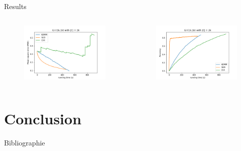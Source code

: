 \documentclass{beamer}
\begin{document}
\begin{frame}{Results}
\begin{columns}
\begin{figure}
    \centering
    \includegraphics[scale = 0.3]{MSE_TIME_1k_1K_2k_big_iter.png}
\end{figure}
\begin{figure}
    \centering
    \includegraphics[scale = 0.3]{ACC_TIME_1k_1k_2k_big_iter.png}
\end{figure}
\end{columns}
\end{frame}
\section{Conclusion}
\begin{frame}[allowframebreaks]{Bibliographie}
    
    
\end{frame}
\end{document}
